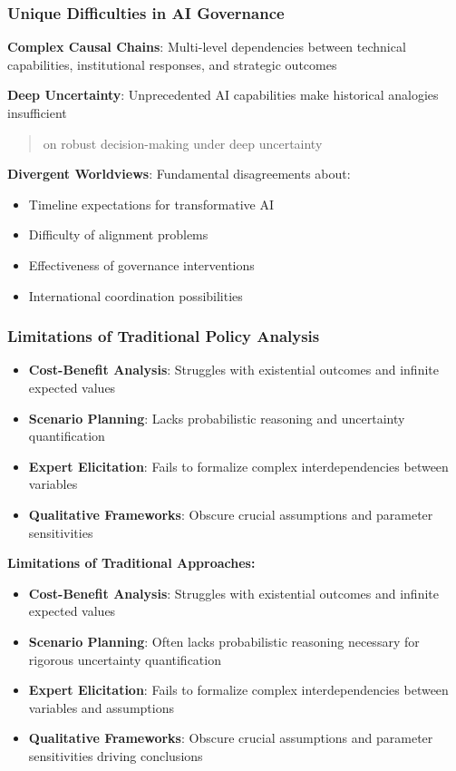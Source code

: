 \documentclass[
  11pt,
  letterpaper,
]{book}
\providecommand{\tightlist}{%
  \setlength{\itemsep}{0pt}\setlength{\parskip}{0pt}}
\begin{document}
\subsubsection{Unique Difficulties in AI
Governance}\label{sec-unique-difficulties}

\textbf{Complex Causal Chains}: Multi-level dependencies between
technical capabilities, institutional responses, and strategic outcomes

\textbf{Deep Uncertainty}: Unprecedented AI capabilities make historical
analogies insufficient

\begin{quote}
\textcite{lempert2003} on robust decision-making under deep uncertainty
\end{quote}

\textbf{Divergent Worldviews}: Fundamental disagreements about:

\begin{itemize}
\tightlist
\item
  Timeline expectations for transformative AI
\item
  Difficulty of alignment problems
\item
  Effectiveness of governance interventions
\item
  International coordination possibilities
\end{itemize}

\subsubsection{Limitations of Traditional Policy
Analysis}\label{sec-traditional-limitations}

\begin{itemize}
\tightlist
\item
  \textbf{Cost-Benefit Analysis}: Struggles with existential outcomes
  and infinite expected values
\item
  \textbf{Scenario Planning}: Lacks probabilistic reasoning and
  uncertainty quantification
\item
  \textbf{Expert Elicitation}: Fails to formalize complex
  interdependencies between variables
\item
  \textbf{Qualitative Frameworks}: Obscure crucial assumptions and
  parameter sensitivities
\end{itemize}

\textbf{Limitations of Traditional Approaches:}

\begin{itemize}
\tightlist
\item
  \textbf{Cost-Benefit Analysis}: Struggles with existential outcomes
  and infinite expected values
\item
  \textbf{Scenario Planning}: Often lacks probabilistic reasoning
  necessary for rigorous uncertainty quantification
\item
  \textbf{Expert Elicitation}: Fails to formalize complex
  interdependencies between variables and assumptions
\item
  \textbf{Qualitative Frameworks}: Obscure crucial assumptions and
  parameter sensitivities driving conclusions
\end{itemize}
\end{document}
